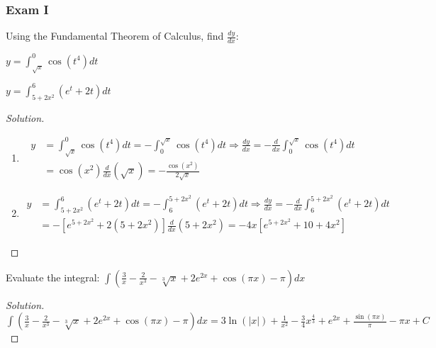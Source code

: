 \documentclass[crop=false,class=article,oneside]{standalone}
\begin{document}
        \subsubsection{Exam I}
        \begin{problem}
        Using the Fundamental Theorem of Calculus, find $\frac{dy}{dx}$:
        \begin{enumerate}
            \begin{multicols}{2}
                \item $y=\int_{\sqrt{x}}^{0}\cos(t^{4})dt$
                \item $y=\int_{5+2x^{2}}^{6}(e^{t}+2t)dt$
            \end{multicols}
        \end{enumerate}
        \end{problem}
        \begin{proof}[Solution]
        \
        \begin{enumerate}
            \item   \begin{align*}
                y&=\int_{\sqrt{x}}^{0}\cos(t^{4})dt=-\int_{0}^{\sqrt{x}}\cos(t^{4})dt\Rightarrow     \frac{dy}{dx}=-\frac{d}{dx}\int_{0}^{\sqrt{x}}\cos(t^{4})dt\\
                &=\cos(x^{2})\frac{d}{dx}(\sqrt{x})=-\frac{\cos(x^{2})}{2\sqrt{x}}
                    \end{align*}
            \item   \begin{align*}
                y&=\int_{5+2x^{2}}^{6}(e^{t}+2t)dt=-\int_{6}^{5+2x^{2}}(e^{t}+2t)dt\Rightarrow \frac{dy}{dx}=-\frac{d}{dx}\int_{6}^{5+2x^{2}}(e^{t}+2t)dt\\
                &=-[e^{5+2x^{2}}+2(5+2x^{2})]\frac{d}{dx}(5+2x^{2})=-4x[e^{5+2x^{2}}+10+4x^{2}]
                    \end{align*}
        \end{enumerate}
        \end{proof}
        \begin{problem}
        Evaluate the integral: $\int(\frac{3}{x}-\frac{2}{x^{3}}-\sqrt[3]{x}+2e^{2x}+\cos(\pi x)-\pi)dx$
        \end{problem}
        \begin{proof}[Solution]
        $\int(\frac{3}{x}-\frac{2}{x^{3}}-\sqrt[3]{x}+2e^{2x}+\cos(\pi x)-\pi)dx=3\ln(|x|)+\frac{1}{x^{2}}-\frac{3}{4}x^{\frac{4}{3}}+e^{2x}+\frac{\sin(\pi x)}{\pi}-\pi x+C$
        \end{proof}
\end{document}
